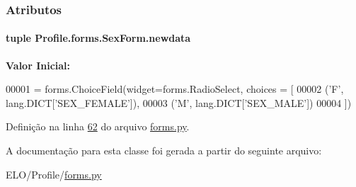 \subsubsection{Atributos}
\hypertarget{classProfile_1_1forms_1_1SexForm_a0d99412ab99ee46149a50fabb2614845}{
\paragraph[{newdata}]{\setlength{\rightskip}{0pt plus 5cm}tuple Profile.\-forms.\-Sex\-Form.\-newdata\hspace{0.3cm}{\ttfamily [static]}}}\label{classProfile_1_1forms_1_1SexForm_a0d99412ab99ee46149a50fabb2614845}
{\bfseries Valor Inicial\-:}
\begin{DoxyCode}
00001 = forms.ChoiceField(widget=forms.RadioSelect, choices = [
00002                                             (\textcolor{stringliteral}{'F'}, lang.DICT[\textcolor{stringliteral}{'SEX\_FEMALE'}]),
00003                                             (\textcolor{stringliteral}{'M'}, lang.DICT[\textcolor{stringliteral}{'SEX\_MALE'}])
00004                                                 ])
\end{DoxyCode}


Definição na linha \hyperlink{Profile_2forms_8py_source_l00062}{62} do arquivo \hyperlink{Profile_2forms_8py_source}{forms.\-py}.



A documentação para esta classe foi gerada a partir do seguinte arquivo\-:\begin{DoxyCompactItemize}
\item 
E\-L\-O/\-Profile/\hyperlink{Profile_2forms_8py}{forms.\-py}\end{DoxyCompactItemize}

